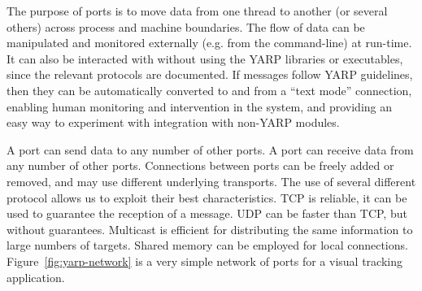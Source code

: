 The purpose of ports is to move data from one thread to another (or
several others) across process and machine boundaries. The flow of
data can be manipulated and monitored externally (e.g. from the
command-line) at run-time.  It can also be interacted with without
using the YARP libraries or executables, since the relevant protocols
are documented.  If messages follow YARP guidelines, then they can be
automatically converted to and from a ``text mode'' connection, 
enabling human monitoring and intervention in the system,
and providing an easy way to experiment with integration with
non-YARP modules.

A port can send data to any number of other ports. A port can receive
data from any number of other ports. Connections between ports can be
freely added or removed, and may use different underlying transports.
The use of several different protocol allows us to exploit their best
characteristics.  TCP is reliable, it can be used to guarantee the
reception of a message.  UDP can be faster than TCP, but without
guarantees.  Multicast is efficient for distributing the same
information to large numbers of targets.  Shared memory can be
employed for local connections.
Figure~\ref{fig:yarp-network} is a very simple network of ports
for a visual tracking application.







